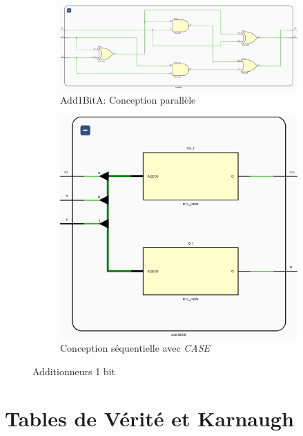\begin{figure}[H]
	\centering
	\begin{subfigure}{0.60 \linewidth}
		\centering
		\vfill
		\includegraphics[width=\textwidth]{assets/img/schematic-add1bita.png}
		\caption{Add1BitA: Conception parallèle}
	\end{subfigure} \hfill
	\begin{subfigure}{0.39 \linewidth}
		\centering
		\includegraphics[width=\textwidth]{assets/img/schematic-add1bitb.png}
		\caption{Conception séquentielle avec \textit{CASE}}
	\end{subfigure}
	\caption{Additionneurs 1 bit}
\end{figure}


\newpage
\section{Tables de Vérité et Karnaugh}

